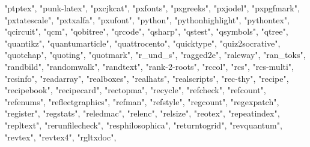 \documentclass[
]{article}
\newenvironment{Shaded}{\begin{snugshade}}{\end{snugshade}}
\newcommand{\NormalTok}[1]{#1}
\newcommand{\StringTok}[1]{\textcolor[rgb]{0.31,0.60,0.02}{#1}}
\begin{document}
\begin{Shaded}
\begin{Highlighting}[]
\StringTok{"ptptex"}\NormalTok{, }\StringTok{"punk{-}latex"}\NormalTok{, }\StringTok{"pxcjkcat"}\NormalTok{, }\StringTok{"pxfonts"}\NormalTok{, }\StringTok{"pxgreeks"}\NormalTok{, }\StringTok{"pxjodel"}\NormalTok{, }
\StringTok{"pxpgfmark"}\NormalTok{, }\StringTok{"pxtatescale"}\NormalTok{, }\StringTok{"pxtxalfa"}\NormalTok{, }\StringTok{"pxufont"}\NormalTok{, }\StringTok{"python"}\NormalTok{, }
\StringTok{"pythonhighlight"}\NormalTok{, }\StringTok{"pythontex"}\NormalTok{, }\StringTok{"qcircuit"}\NormalTok{, }\StringTok{"qcm"}\NormalTok{, }\StringTok{"qobitree"}\NormalTok{, }
\StringTok{"qrcode"}\NormalTok{, }\StringTok{"qsharp"}\NormalTok{, }\StringTok{"qstest"}\NormalTok{, }\StringTok{"qsymbols"}\NormalTok{, }\StringTok{"qtree"}\NormalTok{, }\StringTok{"quantikz"}\NormalTok{, }
\StringTok{"quantumarticle"}\NormalTok{, }\StringTok{"quattrocento"}\NormalTok{, }\StringTok{"quicktype"}\NormalTok{, }\StringTok{"quiz2socrative"}\NormalTok{, }
\StringTok{"quotchap"}\NormalTok{, }\StringTok{"quoting"}\NormalTok{, }\StringTok{"quotmark"}\NormalTok{, }\StringTok{"r\_und\_s"}\NormalTok{, }\StringTok{"ragged2e"}\NormalTok{, }\StringTok{"raleway"}\NormalTok{, }
\StringTok{"ran\_toks"}\NormalTok{, }\StringTok{"randbild"}\NormalTok{, }\StringTok{"randomwalk"}\NormalTok{, }\StringTok{"randtext"}\NormalTok{, }\StringTok{"rank{-}2{-}roots"}\NormalTok{, }
\StringTok{"rccol"}\NormalTok{, }\StringTok{"rcs"}\NormalTok{, }\StringTok{"rcs{-}multi"}\NormalTok{, }\StringTok{"rcsinfo"}\NormalTok{, }\StringTok{"readarray"}\NormalTok{, }\StringTok{"realboxes"}\NormalTok{, }
\StringTok{"realhats"}\NormalTok{, }\StringTok{"realscripts"}\NormalTok{, }\StringTok{"rec{-}thy"}\NormalTok{, }\StringTok{"recipe"}\NormalTok{, }\StringTok{"recipebook"}\NormalTok{, }
\StringTok{"recipecard"}\NormalTok{, }\StringTok{"rectopma"}\NormalTok{, }\StringTok{"recycle"}\NormalTok{, }\StringTok{"refcheck"}\NormalTok{, }\StringTok{"refcount"}\NormalTok{, }
\StringTok{"refenums"}\NormalTok{, }\StringTok{"reflectgraphics"}\NormalTok{, }\StringTok{"refman"}\NormalTok{, }\StringTok{"refstyle"}\NormalTok{, }\StringTok{"regcount"}\NormalTok{, }
\StringTok{"regexpatch"}\NormalTok{, }\StringTok{"register"}\NormalTok{, }\StringTok{"regstats"}\NormalTok{, }\StringTok{"reledmac"}\NormalTok{, }\StringTok{"relenc"}\NormalTok{, }\StringTok{"relsize"}\NormalTok{, }
\StringTok{"reotex"}\NormalTok{, }\StringTok{"repeatindex"}\NormalTok{, }\StringTok{"repltext"}\NormalTok{, }\StringTok{"rerunfilecheck"}\NormalTok{, }\StringTok{"resphilosophica"}\NormalTok{, }
\StringTok{"returntogrid"}\NormalTok{, }\StringTok{"revquantum"}\NormalTok{, }\StringTok{"revtex"}\NormalTok{, }\StringTok{"revtex4"}\NormalTok{, }\StringTok{"rgltxdoc"}\NormalTok{, }

\end{Highlighting}
\end{Shaded}
\end{document}
